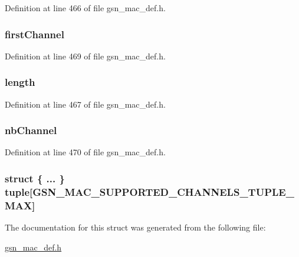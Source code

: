 Definition at line 466 of file gsn\_\-mac\_\-def.h.

\hypertarget{a00133_a1e18c5cf2df41f1ce98b2d9bbac0b385}{
\subsubsection[{firstChannel}]{ {\bf firstChannel}}}
\label{a00133_a1e18c5cf2df41f1ce98b2d9bbac0b385}


Definition at line 469 of file gsn\_\-mac\_\-def.h.

\hypertarget{a00133_ae360fb41f422c7c83b87d9af070cbd31}{
\subsubsection[{length}]{ {\bf length}}}
\label{a00133_ae360fb41f422c7c83b87d9af070cbd31}


Definition at line 467 of file gsn\_\-mac\_\-def.h.

\hypertarget{a00133_a510336fcf155f5fbb50635e76a86456e}{
\subsubsection[{nbChannel}]{ {\bf nbChannel}}}
\label{a00133_a510336fcf155f5fbb50635e76a86456e}


Definition at line 470 of file gsn\_\-mac\_\-def.h.

\hypertarget{a00133_a4fbe8cde4e4aec65bee67df10076a167}{
\subsubsection[{tuple}]{\setlength{\rightskip}{0pt plus 5cm}struct \{ ... \}   {\bf tuple}\mbox{[}GSN\_\-MAC\_\-SUPPORTED\_\-CHANNELS\_\-TUPLE\_\-MAX\mbox{]}}}
\label{a00133_a4fbe8cde4e4aec65bee67df10076a167}


The documentation for this struct was generated from the following file:\begin{DoxyCompactItemize}
\item 
\hyperlink{a00522}{gsn\_\-mac\_\-def.h}\end{DoxyCompactItemize}
